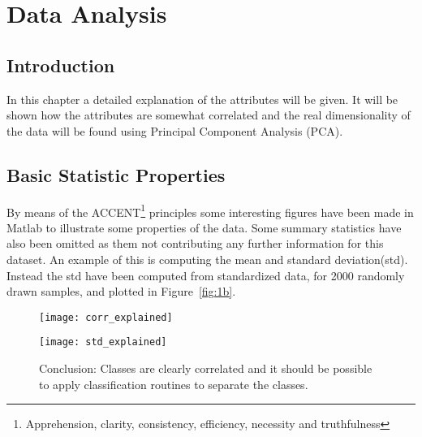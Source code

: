 \chapter{Data Analysis}

\section{Introduction}
In this chapter a detailed explanation of the attributes will be given. It will be shown how the attributes are somewhat correlated and the real dimensionality of the data will be found using Principal Component Analysis (PCA). 

\section{Basic Statistic Properties}
By means of the ACCENT\footnote{Apprehension, clarity, consistency, efficiency, necessity and truthfulness} principles some interesting figures have been made in Matlab to illustrate some properties of the data. Some summary statistics have also been omitted as them not contributing any further information for this dataset. An example of this is computing the mean and standard deviation(std). Instead the std have been computed from standardized data, for 2000 randomly drawn samples, and plotted in Figure~\ref{fig:1b}. 
 
\begin{figure}[hbtp]
\begin{minipage}[t]{.49\linewidth}
\centering
\texttt{[image: corr\_explained]}
\end{minipage}%
\hfill%
\begin{minipage}[t]{.49\linewidth}
\centering
\texttt{[image: std\_explained]}
\end{minipage}
\caption{Conclusion: Classes are clearly correlated and it should be possible to apply classification routines to separate the classes. }
\end{figure}

